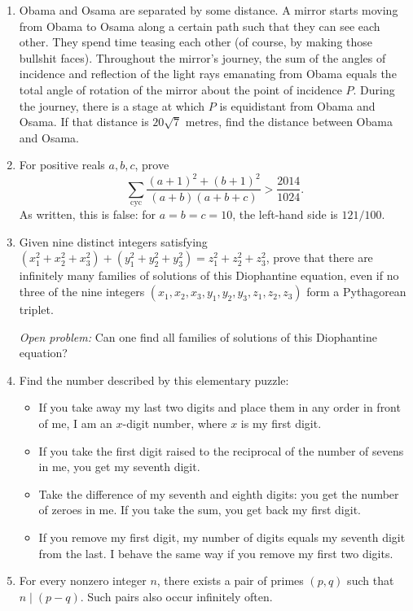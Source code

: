 \documentclass[11pt,a4paper]{article}
\begin{document}
\begin{enumerate}[label=\textbf{\arabic*.},itemsep=.75em]
\item Obama and Osama are separated by some distance. A mirror starts moving from
Obama to Osama along a certain path such that they can see each other. They spend
time teasing each other (of course, by making those bullshit faces). Throughout the
mirror's journey, the sum of the angles of incidence and reflection of the light
rays emanating from Obama equals the total angle of rotation of the mirror about
the point of incidence $P$. During the journey, there is a stage at which $P$ is
equidistant from Obama and Osama. If that distance is $20\sqrt7$ metres, find the
distance between Obama and Osama.

\item For positive reals $a,b,c$, prove
\[
\sum_{\mathrm{cyc}}\frac{(a+1)^2+(b+1)^2}{(a+b)(a+b+c)}>\frac{2014}{1024}.
\]
As written, this is false: for $a=b=c=10$, the left-hand side is $121/100$.

\setcounter{enumi}{25}
\item Given nine distinct integers satisfying
$ (x_1^2+x_2^2+x_3^2)+(y_1^2+y_2^2+y_3^2)=z_1^2+z_2^2+z_3^2$,
prove that there are infinitely many families of solutions of this Diophantine
equation, even if no three of the nine integers
$(x_1,x_2,x_3,y_1,y_2,y_3,z_1,z_2,z_3)$ form a Pythagorean triplet.
\par\emph{Open problem:} Can one find all families of solutions of this Diophantine equation?

\item Find the number described by this elementary puzzle:
\begin{itemize}
\item If you take away my last two digits and place them in any order in front of me,
I am an $x$-digit number, where $x$ is my first digit.
\item If you take the first digit raised to the reciprocal of the number of sevens
in me, you get my seventh digit.
\item Take the difference of my seventh and eighth digits: you get the number of
zeroes in me. If you take the sum, you get back my first digit.
\item If you remove my first digit, my number of digits equals my seventh digit
from the last. I behave the same way if you remove my first two digits.
\end{itemize}

\item For every nonzero integer $n$, there exists a pair of primes $(p,q)$ such that
$n\mid(p-q)$. Such pairs also occur infinitely often.


\end{enumerate}
\end{document}
